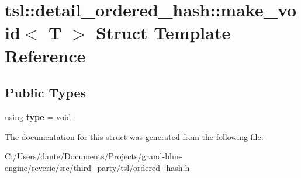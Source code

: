 \hypertarget{structtsl_1_1detail__ordered__hash_1_1make__void}{}\section{tsl\+::detail\+\_\+ordered\+\_\+hash\+::make\+\_\+void$<$ T $>$ Struct Template Reference}
\label{structtsl_1_1detail__ordered__hash_1_1make__void}
\subsection*{Public Types}
\begin{DoxyCompactItemize}
\item 
\mbox{\label{structtsl_1_1detail__ordered__hash_1_1make__void_a1a31ef466692dfb052e6781ac54d382c}} 
using {\bfseries type} = void
\end{DoxyCompactItemize}


The documentation for this struct was generated from the following file\+:\begin{DoxyCompactItemize}
\item 
C\+:/\+Users/dante/\+Documents/\+Projects/grand-\/blue-\/engine/reverie/src/third\+\_\+party/tsl/ordered\+\_\+hash.\+h\end{DoxyCompactItemize}
